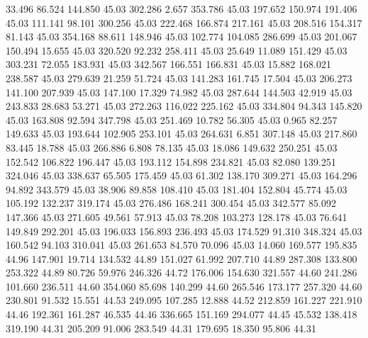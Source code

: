   33.496   86.524  144.850        45.03
 302.286    2.657  353.786        45.03
 197.652  150.974  191.406        45.03
 111.141   98.101  300.256        45.03
 222.468  166.874  217.161        45.03
 208.516  154.317   81.143        45.03
 354.168   88.611  148.946        45.03
 102.774  104.085  286.699        45.03
 201.067  150.494   15.655        45.03
 320.520   92.232  258.411        45.03
  25.649   11.089  151.429        45.03
 303.231   72.055  183.931        45.03
 342.567  166.551  166.831        45.03
  15.882  168.021  238.587        45.03
 279.639   21.259   51.724        45.03
 141.283  161.745   17.504        45.03
 206.273  141.100  207.939        45.03
 147.100   17.329   74.982        45.03
 287.644  144.503   42.919        45.03
 243.833   28.683   53.271        45.03
 272.263  116.022  225.162        45.03
 334.804   94.343  145.820        45.03
 163.808   92.594  347.798        45.03
 251.469   10.782   56.305        45.03
   0.965   82.257  149.633        45.03
 193.644  102.905  253.101        45.03
 264.631    6.851  307.148        45.03
 217.860   83.445   18.788        45.03
 266.886    6.808   78.135        45.03
  18.086  149.632  250.251        45.03
 152.542  106.822  196.447        45.03
 193.112  154.898  234.821        45.03
  82.080  139.251  324.046        45.03
 338.637   65.505  175.459        45.03
  61.302  138.170  309.271        45.03
 164.296   94.892  343.579        45.03
  38.906   89.858  108.410        45.03
 181.404  152.804   45.774        45.03
 105.192  132.237  319.174        45.03
 276.486  168.241  300.454        45.03
 342.577   85.092  147.366        45.03
 271.605   49.561   57.913        45.03
  78.208  103.273  128.178        45.03
  76.641  149.849  292.201        45.03
 196.033  156.893  236.493        45.03
 174.529   91.310  348.324        45.03
 160.542   94.103  310.041        45.03
 261.653   84.570   70.096        45.03
  14.060  169.577  195.835        44.96
 147.901   19.714  134.532        44.89
 151.027   61.992  207.710        44.89
 287.308  133.800  253.322        44.89
  80.726   59.976  246.326        44.72
 176.006  154.630  321.557        44.60
 241.286  101.660  236.511        44.60
 354.060   85.698  140.299        44.60
 265.546  173.177  257.320        44.60
 230.801   91.532   15.551        44.53
 249.095  107.285   12.888        44.52
 212.859  161.227  221.910        44.46
 192.361  161.287   46.535        44.46
 336.665  151.169  294.077        44.45
  45.532  138.418  319.190        44.31
 205.209   91.006  283.549        44.31
 179.695   18.350   95.806        44.31
